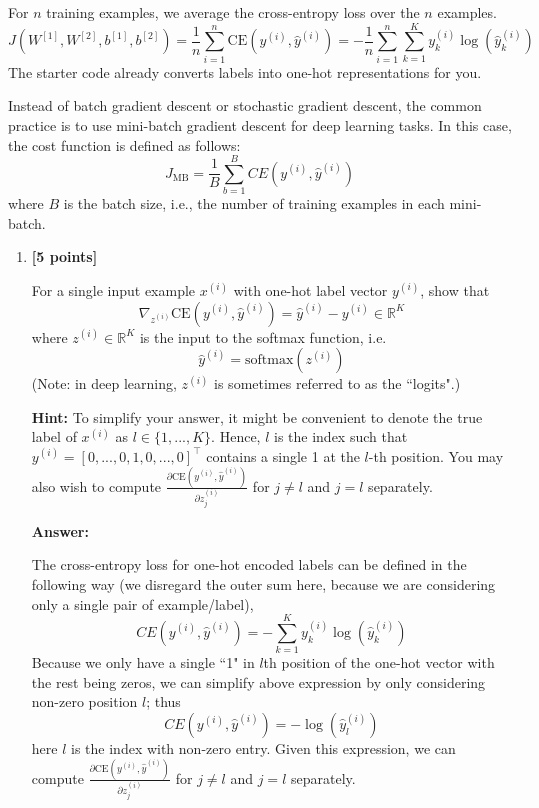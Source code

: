 \documentclass{article}
\begin{document}
For $n$ training examples, we average the cross-entropy loss over the $n$ examples.
\[ 
J(W^{[1]}, W^{[2]}, b^{[1]}, b^{[2]}) = \frac{1}{n} \sum_{i=1}^{n} \text{CE}(y^{(i)}, \hat{y}^{(i)}) = - \frac{1}{n} \sum_{i=1}^{n} \sum_{k=1}^{K} y_k^{(i)} \log(\hat{y}_k^{(i)})
\]
The starter code already converts labels into one-hot representations for you.

Instead of batch gradient descent or stochastic gradient descent, the common practice is to use mini-batch gradient descent for deep learning tasks. In this case, the cost function is defined as follows:
\[ 
J_{\text{MB}} = \frac{1}{B} \sum_{b=1}^{B} CE(y^{(i)},\hat{y}^{(i)} )
\]
where $B$ is the batch size, i.e., the number of training examples in each mini-batch.

\begin{enumerate}[label=(\alph*)]
    \item \textbf{[5 points]}
    
    For a single input example $x^{(i)}$ with one-hot label vector $y^{(i)}$, show that
\[ \nabla_{z^{(i)}} \text{CE}(y^{(i)}, \hat{y}^{(i)}) = \hat{y}^{(i)} - y^{(i)} \in \mathbb{R}^K \]
where $z^{(i)} \in \mathbb{R}^K$ is the input to the softmax function, i.e.
\[ \hat{y}^{(i)} = \text{softmax}(z^{(i)}) \]
(Note: in deep learning, $z^{(i)}$ is sometimes referred to as the ``logits".)

\textbf{Hint:} To simplify your answer, it might be convenient to denote the true label of $x^{(i)}$ as $l \in \{1, ..., K\}$. Hence, $l$ is the index such that $y^{(i)} = [0, ..., 0, 1, 0, ..., 0]^{\top}$ contains a single 1 at the $l$-th position. You may also wish to compute $\frac{\partial \text{CE}(y^{(i)}, \hat{y}^{(i)})}{\partial z^{(i)}_j}$ for $j \neq l$ and $j=l$ separately.

\textbf{Answer:}

The cross-entropy loss for one-hot encoded labels can be defined in the following way (we disregard the outer sum here, because we are considering only a single pair of example/label),
\[ 
CE(y^{(i)}, \hat{y}^{(i)}) = - \sum_{k=1}^{K} y^{(i)}_k \log(\hat{y}^{(i)}_k) 
\]
Because we only have a single ``1" in $l$th position of the one-hot vector with the rest being zeros, we can simplify above expression by only considering non-zero position $l$; thus
\[
CE(y^{(i)}, \hat{y}^{(i)}) = - \log(\hat{y}^{(i)}_l) 
\]
here $ l $ is the index with non-zero entry.
Given this expression, we can compute $\frac{\partial \text{CE}(y^{(i)}, \hat{y}^{(i)})}{\partial z^{(i)}_j}$ for $j \neq l$ and $j=l$ separately.


\end{enumerate}
\end{document}
